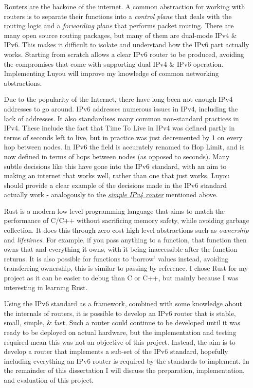 \documentclass[12pt,a4paper,twoside,openany]{report}
\begin{document}
Routers are the backone of the internet. A common abstraction for working with routers is to separate their functions into a \textit{control plane} that deals with the routing logic and a \textit{forwarding plane} that performs packet routing. There are many open source routing packages\cite{open_source_routing}, but many of them are dual-mode IPv4 \& IPv6. This makes it difficult to isolate and understand how the IPv6 part actually works.  Starting from scratch allows a clear IPv6 router to be produced, avoiding the compromises that come with supporting dual IPv4 \& IPv6 operation.  Implementing Luyou will improve my knowledge of common networking abstractions.

\bigskip

Due to the popularity of the Internet, there have long been not enough IPv4\cite{ipv4_rfc} addresses to go around. IPv6 addresses numerous issues in IPv4, including the lack of addresses. It also standardises many common non-standard practices in IPv4. These include the fact that Time To Live in IPv4 was defined partly in terms of seconds left to live, but in practice was just decremented by 1 on every hop between nodes. In IPv6 the field is accurately renamed to Hop Limit, and is now defined in terms of hops between nodes (as opposed to seconds). Many subtle decisions like this have gone into the IPv6 standard, with an aim to making an internet that works well, rather than one that just works. Luyou should provide a clear example of the decisions made in the IPv6 standard actually work - analogously to the \hyperref[lab::simple_router]{\textit{simple IPv4 router}}\cite{simple_router} mentioned above.

\bigskip

Rust\cite{rust} is a modern low level programming language that aims to match the performance of C/C++ without sacrificing memory safety, while avoiding garbage collection. It does this through zero-cost high level abstractions such as \textit{ownership} and \textit{lifetimes}. For example, if you pass anything to a function, that function then owns that and everything it owns, with it being inaccessible after the function returns. It is also possible for functions to `borrow' values instead, avoiding transferring ownership, this is similar to passing by reference.  I chose Rust for my project as it can be easier to debug than C or C++, but mainly because I was interesting in learning Rust.

\bigskip

Using the IPv6 standard as a framework, combined with some knowledge about the internals of routers, it is possible to develop an IPv6 router that is stable, small, simple, \& fast.  Such a router could continue to be developed until it was ready to be deployed on actual hardware, but the implementation and testing required mean this was not an objective of this project.  Instead, the aim is to develop a router that implements a sub-set of the IPv6 standard, hopefully including everything an IPv6 router is required by the standards to implement.  In the remainder of this dissertation I will discuss the preparation, implementation, and evaluation of this project.
\end{document}
